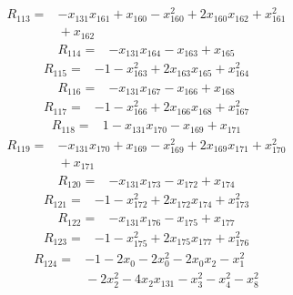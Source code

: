 {\begin{align*}
R_{113} ={}& -x_{131} x_{161} + x_{160} - x_{160}^{2} + 2x_{160} x_{162} + x_{161}^{2} \\
&{}  + x_{162}
\end{align*}
\begin{align*}
R_{114} ={}& -x_{131} x_{164} - x_{163} + x_{165}
\end{align*}
\begin{align*}
R_{115} ={}& -1 - x_{163}^{2} + 2x_{163} x_{165} + x_{164}^{2}
\end{align*}
\begin{align*}
R_{116} ={}& -x_{131} x_{167} - x_{166} + x_{168}
\end{align*}
\begin{align*}
R_{117} ={}& -1 - x_{166}^{2} + 2x_{166} x_{168} + x_{167}^{2}
\end{align*}
\begin{align*}
R_{118} ={}& 1 - x_{131} x_{170} - x_{169} + x_{171}
\end{align*}
\begin{align*}
R_{119} ={}& -x_{131} x_{170} + x_{169} - x_{169}^{2} + 2x_{169} x_{171} + x_{170}^{2} \\
&{}  + x_{171}
\end{align*}
\begin{align*}
R_{120} ={}& -x_{131} x_{173} - x_{172} + x_{174}
\end{align*}
\begin{align*}
R_{121} ={}& -1 - x_{172}^{2} + 2x_{172} x_{174} + x_{173}^{2}
\end{align*}
\begin{align*}
R_{122} ={}& -x_{131} x_{176} - x_{175} + x_{177}
\end{align*}
\begin{align*}
R_{123} ={}& -1 - x_{175}^{2} + 2x_{175} x_{177} + x_{176}^{2}
\end{align*}
\begin{align*}
R_{124} ={}& -1 - 2x_{0} - 2x_{0}^{2} - 2x_{0} x_{2} - x_{1}^{2} \\
&{}  - 2x_{2}^{2} - 4x_{2} x_{131} - x_{3}^{2} - x_{4}^{2} - x_{8}^{2} \\

\end{align*}}
